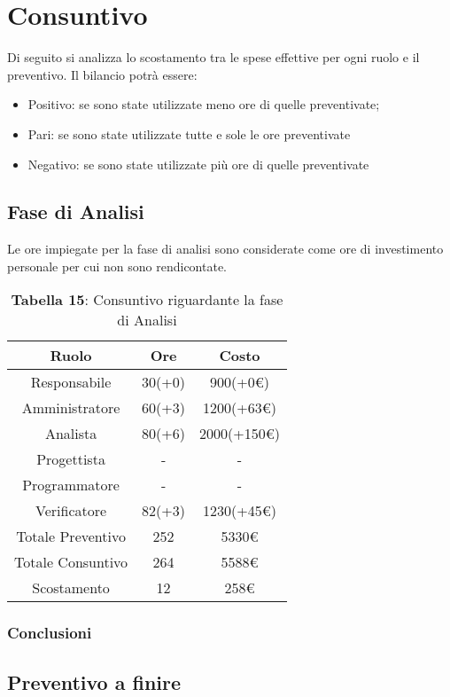 \section{Consuntivo}
Di seguito si analizza lo scostamento tra le spese effettive per ogni ruolo e il preventivo. Il bilancio potrà essere:
\begin{itemize}
	\item Positivo: se sono state utilizzate meno ore di quelle preventivate;
	\item Pari: se sono state utilizzate tutte e sole le ore preventivate
	\item Negativo: se sono state utilizzate più ore di quelle preventivate
\end{itemize}
\subsection{Fase di Analisi}
Le ore impiegate per la fase di analisi sono considerate come ore di investimento personale per cui non sono rendicontate.
\begin{table}[H]
	\centering
	\renewcommand{\arraystretch}{1.5}
	\begin{tabular}{|c|c|c|}
		\hline
		\rowcolor{lighter-grayer}
		Ruolo & Ore & Costo \\
		\hline
		Responsabile & 30(+0) & 900(+0\euro) \\
		\hline
		Amministratore & 60(+3) & 1200(+63\euro)  \\
		\hline
		Analista &  80(+6) & 2000(+150\euro)  \\
		\hline
		Progettista& - & - \\
		\hline
		Programmatore & - & - \\
		\hline
		Verificatore & 82(+3) & 1230(+45\euro) \\
		\hline
		Totale Preventivo & 252 & 5330\euro \\
		\hline
		Totale Consuntivo & 264 & 5588\euro \\
		\hline
		Scostamento & 12 & 258\euro \\
		\hline
	\end{tabular}
	\caption*{\textbf{Tabella 15}: Consuntivo riguardante la fase di Analisi\\}
\end{table}
\subsubsection{Conclusioni}
\subsection{Preventivo a finire}